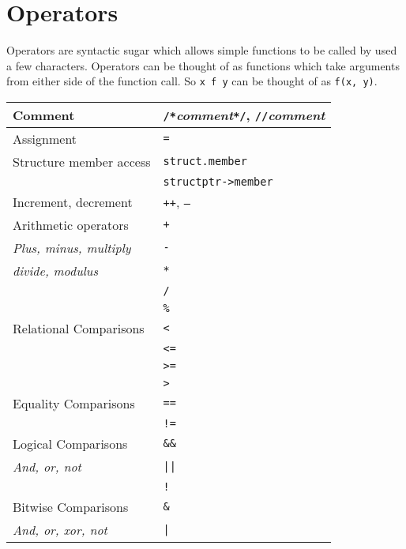 \documentclass[10pt]{article}
\begin{document}
\section{Operators}
Operators are syntactic sugar which allows simple functions to be called by used a few characters.
Operators can be thought of as functions which take arguments from either side of the function call.
So \texttt{x f y} can be thought of as \texttt{f(x, y)}.

\begin{center}
    \begin{tabularx}{\columnwidth}{@{\extracolsep{\fill}} |l|X| }
      \hline
      Comment                   & \texttt{/*}\textit{comment}\texttt{*/}, \texttt{//}\textit{comment} \\ \hline
      Assignment                & \texttt{=} \\ \hline
      Structure member access   & \texttt{struct.member} \\
                                & \texttt{structptr->member} \\ \hline
      Increment, decrement      & \texttt{++}, \texttt{--} \\ \hline
      Arithmetic operators      & \texttt{+} \\ 
\textit{Plus, minus, multiply}  & \texttt{-} \\ 
\textit{divide, modulus}        & \texttt{*} \\ 
                                & \texttt{/} \\ 
                                & \texttt{\%} \\ \hline
      Relational Comparisons    & \texttt{<} \\ 
                                & \texttt{<=} \\ 
                                & \texttt{>=} \\ 
                                & \texttt{>} \\ \hline
      Equality Comparisons      & \texttt{==} \\ 
                                & \texttt{!=} \\ \hline
      Logical Comparisons       & \texttt{\&\&} \\ 
\textit{And, or, not}           & \texttt{||} \\
                                & \texttt{!} \\ \hline
      Bitwise Comparisons       & \texttt{\&} \\ 
\textit{And, or, xor, not}      & \texttt{|} \\

\end{tabularx}
\end{center}
\end{document}
